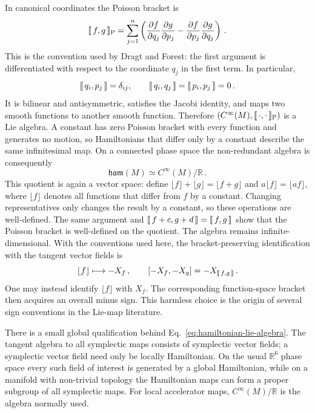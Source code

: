 In canonical coordinates the Poisson bracket is
\begin{equation}\label{eq:canonical-poisson-bracket}
    \llbracket \, f,g\,\rrbracket_{\mathrm P} = \sum_{j = 1}^{n}\left(
    \frac{\partial {f}}{\partial {q_j}}\frac{\partial {g}}{\partial {p_j}}
    -\frac{\partial {f}}{\partial {p_j}}\frac{\partial {g}}{\partial {q_j}}
    \right)\,.
\end{equation}
This is the convention used by Dragt and Forest: the first argument is
differentiated with respect to the coordinate $q_j$ in the first term.  In
particular,
\begin{equation}
    \llbracket \, q_i,p_j\,\rrbracket = \delta_{ij},\qquad
    \llbracket \, q_i,q_j\,\rrbracket = \llbracket \, p_i,p_j\,\rrbracket = 0\,.
\end{equation}
It is bilinear and antisymmetric, satisfies the Jacobi identity, and maps
two smooth functions to another smooth function.  Therefore
$(C^\infty(M),\llbracket \, \mathord{\cdot},\mathord{\cdot}\,\rrbracket_{\mathrm P})$ is a Lie algebra.  A constant has
zero Poisson bracket with every function and generates no motion, so
Hamiltonians that differ only by a constant describe the same infinitesimal
map.  On a connected phase space the non-redundant algebra is consequently
\begin{equation}\label{eq:hamiltonian-lie-algebra}
    \mathfrak{ham}(M)\simeq C^\infty(M)/\mathbb{R}\,.
\end{equation}
This quotient is again a vector space: define
$\lfloor f\rfloor + \lfloor g\rfloor = \lfloor f + g\rfloor$ and
$a\lfloor f\rfloor = \lfloor a f\rfloor$, where $\lfloor f\rfloor$ denotes
all functions that differ from $f$ by a constant.  Changing representatives
only changes the result by a constant, so these operations are well-defined.
The same argument and $\llbracket \, f + c,g + d\,\rrbracket = \llbracket \, f,g\,\rrbracket$ show that
the Poisson bracket is well-defined on the quotient.  The algebra remains
infinite-dimensional.  With the conventions used here, the bracket-preserving
identification with the tangent vector fields is
\begin{equation}
    \lfloor f\rfloor \longmapsto -X_f\,,
    \qquad [-X_f,-X_g] = -X_{\llbracket \, f,g\,\rrbracket}\,.
\end{equation}
One may instead identify $\lfloor f\rfloor$ with $X_f$.  The corresponding
function-space bracket then acquires an overall minus sign.  This harmless
choice is the origin of several sign conventions in the Lie-map literature.

There is a small global qualification behind
Eq.~\eqref{eq:hamiltonian-lie-algebra}. The tangent algebra to all symplectic
maps consists of symplectic vector fields; a symplectic vector field need only
be locally Hamiltonian.  On the usual $\mathbb{R}^6$ phase space every such
field of interest is generated by a global Hamiltonian, while on a manifold
with non-trivial topology the Hamiltonian maps can form a proper subgroup of
all symplectic maps.  For local accelerator maps, $C^\infty(M)/\mathbb{R}$ is
the algebra normally used.

